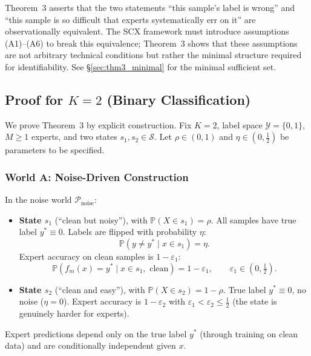 \begin{remark}
  Theorem~3 asserts that the two statements ``this sample's label is wrong''
  and ``this sample is so difficult that experts systematically err on it'' are
  observationally equivalent.  The SCX framework must introduce assumptions
  (A1)--(A6) to break this equivalence; Theorem~3 shows that these assumptions
  are not arbitrary technical conditions but rather the minimal structure
  required for identifiability.  See \S\ref{sec:thm3_minimal} for the minimal
  sufficient set.
\end{remark}

\subsection{Proof for $K=2$ (Binary Classification)}
\label{sec:thm3_proof_K2}

We prove Theorem~3 by explicit construction.  Fix $K=2$, label space
$\mathcal{Y}=\{0,1\}$, $M\ge 1$ experts, and two states $s_1,s_2\in\mathcal{S}$.
Let $\rho\in(0,1)$ and $\eta\in(0,\tfrac12)$ be parameters to be specified.

\subsubsection{World A: Noise-Driven Construction}
\label{sec:thm3_worldA}

In the noise world $\mathcal{P}_{\text{noise}}$:

\begin{itemize}
  \item \textbf{State $s_1$} (``clean but noisy''), with
    $\mathbb{P}(X\in s_1)=\rho$.  All samples have true label $y^*\equiv0$.
    Labels are flipped with probability $\eta$:
    \[
    \mathbb{P}(y\neq y^* \mid x\in s_1)=\eta.
    \]
    Expert accuracy on clean samples is $1-\varepsilon_1$:
    \[
    \mathbb{P}(f_m(x)=y^* \mid x\in s_1,\text{ clean})=1-\varepsilon_1,
    \qquad \varepsilon_1\in(0,\tfrac12).
    \]
  \item \textbf{State $s_2$} (``clean and easy''), with
    $\mathbb{P}(X\in s_2)=1-\rho$.  True label $y^*\equiv0$, no noise
    ($\eta=0$).  Expert accuracy is $1-\varepsilon_2$ with
    $\varepsilon_1<\varepsilon_2\le\tfrac12$ (the state is genuinely harder
    for experts).
\end{itemize}

Expert predictions depend only on the true label $y^*$ (through training on
clean data) and are conditionally independent given $x$.

